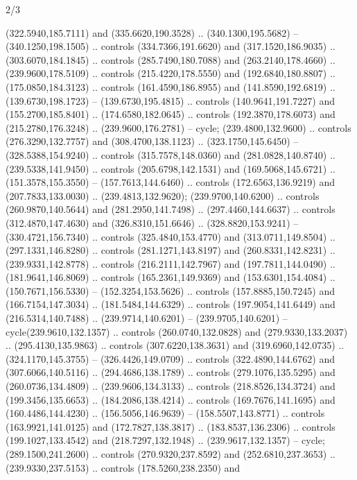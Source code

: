 \begin{flagdescription}{2/3}
\begin{scope}[yshift=0.5\flagwidth,xshift=0.4\flaglength,y=0.00183\flagwidth,x=0.00183\flagwidth,yscale=-1,inner sep=0pt,outer sep=0pt]
\begin{scope}[xshift=-0.517\flagwidth,yshift=-0.285\flagwidth]
\begin{scope}[cm={{1.42403,0.0,0.0,1.42403,(-59.10036,-127.66903)}},draw=black,fill=gold,line join=round,line cap=round,even odd rule,line width=0.0015\flagwidth]
  (322.5940,185.7111) and (335.6620,190.3528) .. (340.1300,195.5682) --
  (340.1250,198.1505) .. controls (334.7366,191.6620) and (317.1520,186.9035) ..
  (303.6070,184.1845) .. controls (285.7490,180.7088) and (263.2140,178.4660) ..
  (239.9600,178.5109) .. controls (215.4220,178.5550) and (192.6840,180.8807) ..
  (175.0850,184.3123) .. controls (161.4590,186.8955) and (141.8590,192.6819) ..
  (139.6730,198.1723) -- (139.6730,195.4815) .. controls (140.9641,191.7227) and
  (155.2700,185.8401) .. (174.6580,182.0645) .. controls (192.3870,178.6073) and
  (215.2780,176.3248) .. (239.9600,176.2781) -- cycle;
 (239.4800,132.9600) .. controls (276.3290,132.7757) and
  (308.4700,138.1123) .. (323.1750,145.6450) -- (328.5388,154.9240) .. controls
  (315.7578,148.0360) and (281.0828,140.8740) .. (239.5338,141.9450) .. controls
  (205.6798,142.1531) and (169.5068,145.6721) .. (151.3578,155.3550) --
  (157.7613,144.6460) .. controls (172.6563,136.9219) and (207.7833,133.0030) ..
  (239.4813,132.9620);
  (239.9700,140.6200) .. controls (260.9870,140.5644) and
  (281.2950,141.7498) .. (297.4460,144.6637) .. controls (312.4870,147.4630) and
  (326.8310,151.6646) .. (328.8820,153.9241) -- (330.4721,156.7340) .. controls
  (325.4840,153.4770) and (313.0711,149.8504) .. (297.1331,146.8280) .. controls
  (281.1271,143.8197) and (260.8331,142.8231) .. (239.9331,142.8778) .. controls
  (216.2111,142.7967) and (197.7811,144.0490) .. (181.9641,146.8069) .. controls
  (165.2361,149.9369) and (153.6301,154.4084) .. (150.7671,156.5330) --
  (152.3254,153.5626) .. controls (157.8885,150.7245) and (166.7154,147.3034) ..
  (181.5484,144.6329) .. controls (197.9054,141.6449) and (216.5314,140.7488) ..
  (239.9714,140.6201) -- (239.9705,140.6201) -- cycle(239.9610,132.1357) ..
  controls (260.0740,132.0828) and (279.9330,133.2037) .. (295.4130,135.9863) ..
  controls (307.6220,138.3631) and (319.6960,142.0735) .. (324.1170,145.3755) --
  (326.4426,149.0709) .. controls (322.4890,144.6762) and (307.6066,140.5116) ..
  (294.4686,138.1789) .. controls (279.1076,135.5295) and (260.0736,134.4809) ..
  (239.9606,134.3133) .. controls (218.8526,134.3724) and (199.3456,135.6653) ..
  (184.2086,138.4214) .. controls (169.7676,141.1695) and (160.4486,144.4230) ..
  (156.5056,146.9639) -- (158.5507,143.8771) .. controls (163.9921,141.0125) and
  (172.7827,138.3817) .. (183.8537,136.2306) .. controls (199.1027,133.4542) and
  (218.7297,132.1948) .. (239.9617,132.1357) -- cycle;
 (289.1500,241.2600) .. controls (270.9320,237.8592) and
  (252.6810,237.3653) .. (239.9330,237.5153) .. controls (178.5260,238.2350) and

\end{scope}
\end{scope}
\end{scope}
\end{flagdescription}
